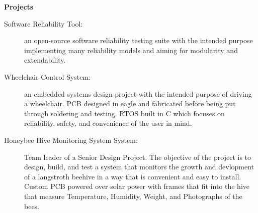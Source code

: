 \documentclass[letterpaper,11pt]{article}
\newcommand{\resheading}[1]{{\large \colorbox{mygrey}{\begin{minipage}{\textwidth}{\textbf{#1 \vphantom{p\^{E}}}}\end{minipage}}}}
\begin{document}
\begin{description}
	\end{description} %

\resheading{{Projects}}

\begin{description}
\item[Software Reliability Tool:] { \footnotesize an open-source software reliability testing suite with the intended purpose implementing many reliability models and aiming for modularity and extendability.  }

\item[Wheelchair Control System:] { \footnotesize an embedded systems design project with the intended purpose of driving a wheelchair. PCB designed in eagle and fabricated before being put through soldering and testing. RTOS built in C which focuses on reliability, safety, and convenience of the user in mind.}

\item[Honeybee Hive Monitoring System System:] { \footnotesize Team leader of a Senior Design Project. The objective of the project is to design, build, and test a system that monitors the growth and devlopment of a langstroth beehive in a way that is convenient and easy to install. Custom PCB powered over solar power with frames that fit into the hive that measure Temperature, Humidity, Weight, and Photographs of the bees.}

\end{description}
\end{document}
